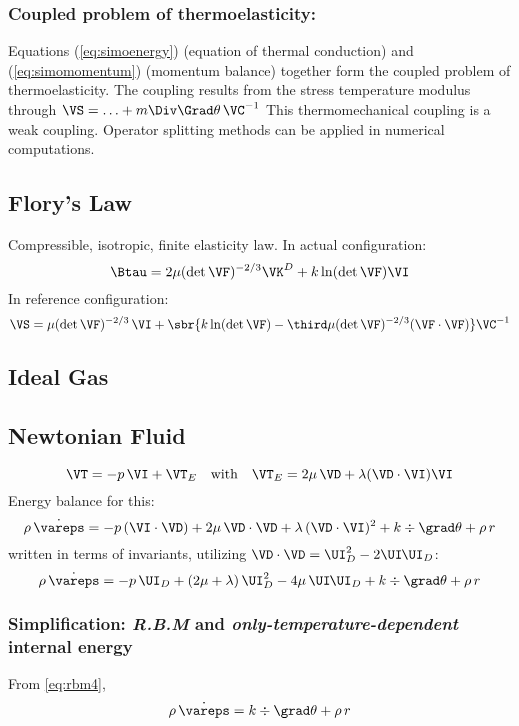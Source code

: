 \documentclass[a5paper,twosided,11pt,DIV=15,BCOR=0mm]{scrbook}
\newcommand{\veps}{\vareps}
\newcommand{\rtwo}{\UI\hspace{-0.07em}\UI}
\begin{document}
\subsubsection{Coupled problem of thermoelasticity:} Equations (\ref{eq:simoenergy})
(equation of thermal conduction) and (\ref{eq:simomomentum}) (momentum balance)
together form the coupled problem of thermoelasticity.
%
The coupling results from the stress temperature modulus through
$\VS=\ldots+m\Div\Grad\theta\,\VC^{-1}$
%
This thermomechanical coupling is a weak coupling. Operator splitting methods
can be applied in numerical computations.
\subsection{Flory's Law}
Compressible, isotropic, finite elasticity law. In actual configuration:
\begin{equation}
  \Btau=2\mu(\det\VF)^{-2/3}\VK^D + k \ln(\det\VF)\VI
\end{equation}
In reference configuration:
\begin{equation}
  \VS=\mu(\det\VF)^{-2/3}\, \VI+\sbr{k\ln(\det\VF)-
    \third\mu(\det\VF)^{-2/3}(\VF\cdot\VF)}\VC^{-1}
\end{equation}
%
\subsection{Ideal Gas}
%
\subsection{Newtonian Fluid}
\begin{equation}
  \VT=-p\,\VI+\VT_E \quad \textrm{with} \quad
  \VT_E=2\mu\,\VD+\lambda(\VD\cdot\VI)\VI
\end{equation}
Energy balance for this:
\begin{equation}
  \rho\,\dot{\veps} = -p\, (\VI\cdot\VD)+2\mu\, \VD\cdot\VD
  +\lambda\,(\VD\cdot\VI)^2 + k\div\grad\theta+\rho\,r
\end{equation}
written in terms of invariants, utilizing $\VD\cdot\VD=\UI_D^2-2\rtwo_D$:
\begin{equation}
  \rho\,\dot{\veps}=-p\,\UI_D+(2\mu+\lambda)\,\UI_D^2 - 4\mu\,\rtwo_D
  + k\div\grad\theta + \rho\,r
\end{equation}
%
\subsubsection{Simplification: \emph{R.B.M} and \emph{only-temperature-dependent}
  internal energy}
%
From \eqref{eq:rbm4},
\begin{equation}
  \rho\,\dot{\veps} = k \div\grad\theta + \rho\,r
\end{equation}
%
\end{document}
